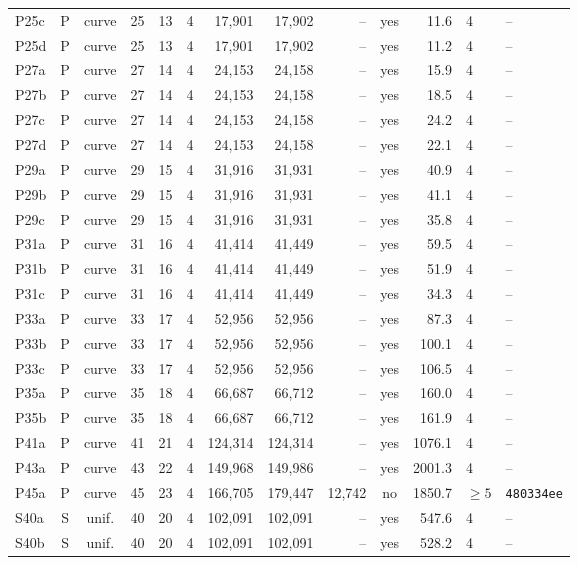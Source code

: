 \begin{tabular}{@{}lccrrrrrrcrll@{}}
P25c & P & curve & 25 & 13 & 4 & 17{,}901 & 17{,}902 & -- & yes & 11.6 & 4 & -- \\
P25d & P & curve & 25 & 13 & 4 & 17{,}901 & 17{,}902 & -- & yes & 11.2 & 4 & -- \\
P27a & P & curve & 27 & 14 & 4 & 24{,}153 & 24{,}158 & -- & yes & 15.9 & 4 & -- \\
P27b & P & curve & 27 & 14 & 4 & 24{,}153 & 24{,}158 & -- & yes & 18.5 & 4 & -- \\
P27c & P & curve & 27 & 14 & 4 & 24{,}153 & 24{,}158 & -- & yes & 24.2 & 4 & -- \\
P27d & P & curve & 27 & 14 & 4 & 24{,}153 & 24{,}158 & -- & yes & 22.1 & 4 & -- \\
P29a & P & curve & 29 & 15 & 4 & 31{,}916 & 31{,}931 & -- & yes & 40.9 & 4 & -- \\
P29b & P & curve & 29 & 15 & 4 & 31{,}916 & 31{,}931 & -- & yes & 41.1 & 4 & -- \\
P29c & P & curve & 29 & 15 & 4 & 31{,}916 & 31{,}931 & -- & yes & 35.8 & 4 & -- \\
P31a & P & curve & 31 & 16 & 4 & 41{,}414 & 41{,}449 & -- & yes & 59.5 & 4 & -- \\
P31b & P & curve & 31 & 16 & 4 & 41{,}414 & 41{,}449 & -- & yes & 51.9 & 4 & -- \\
P31c & P & curve & 31 & 16 & 4 & 41{,}414 & 41{,}449 & -- & yes & 34.3 & 4 & -- \\
P33a & P & curve & 33 & 17 & 4 & 52{,}956 & 52{,}956 & -- & yes & 87.3 & 4 & -- \\
P33b & P & curve & 33 & 17 & 4 & 52{,}956 & 52{,}956 & -- & yes & 100.1 & 4 & -- \\
P33c & P & curve & 33 & 17 & 4 & 52{,}956 & 52{,}956 & -- & yes & 106.5 & 4 & -- \\
P35a & P & curve & 35 & 18 & 4 & 66{,}687 & 66{,}712 & -- & yes & 160.0 & 4 & -- \\
P35b & P & curve & 35 & 18 & 4 & 66{,}687 & 66{,}712 & -- & yes & 161.9 & 4 & -- \\
P41a & P & curve & 41 & 21 & 4 & 124{,}314 & 124{,}314 & -- & yes & 1076.1 & 4 & -- \\
P43a & P & curve & 43 & 22 & 4 & 149{,}968 & 149{,}986 & -- & yes & 2001.3 & 4 & -- \\
P45a & P & curve & 45 & 23 & 4 & 166{,}705 & 179{,}447 & 12{,}742 & no & 1850.7 & $\ge5$ & \texttt{480334ee} \\
\addlinespace
S40a & S & unif. & 40 & 20 & 4 & 102{,}091 & 102{,}091 & -- & yes & 547.6 & 4 & -- \\
S40b & S & unif. & 40 & 20 & 4 & 102{,}091 & 102{,}091 & -- & yes & 528.2 & 4 & -- \\
\bottomrule
\end{tabular}
